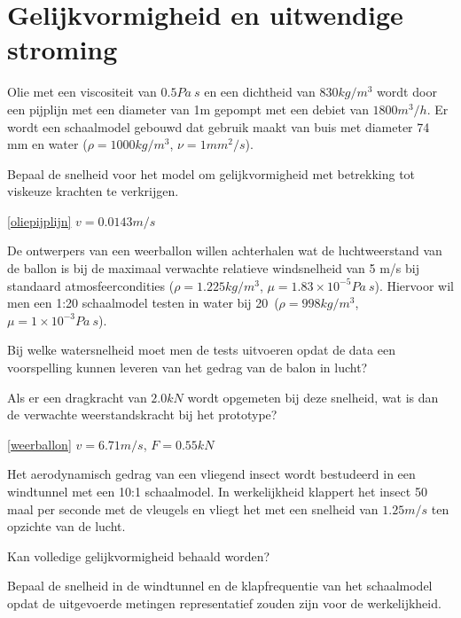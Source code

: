 \chapter{Gelijkvormigheid en uitwendige stroming}
\label{sec:Gelijkvormigheid en uitwendige stroming}
\begin{toepassing}
	\label{oliepijplijn}
Olie met een viscositeit van $0.5 \unit{Pa\ s}$ en een dichtheid van $830 \unit{kg/m^3}$ wordt door een pijplijn met een diameter van 1m gepompt met een debiet van $1800 \unit{m^3/h}$. Er wordt een schaalmodel gebouwd dat gebruik maakt van buis met diameter 74 mm en water ($\rho = 1000 \unit{kg/m^3}$, $\nu = 1 \unit{mm^2/s}$).

Bepaal de snelheid voor het model om gelijkvormigheid met betrekking tot viskeuze krachten te verkrijgen.
\end{toepassing}
\begin{antwoord}{\ref{oliepijplijn}}
	$v = 0.0143 \unit{m/s}$
\end{antwoord}
\begin{toepassing}[*]
	\label{weerballon}
De ontwerpers van een weerballon willen achterhalen wat de luchtweerstand van de ballon is bij de maximaal verwachte relatieve windsnelheid van 5 m/s bij standaard atmosfeercondities ($\rho = 1.225 \unit{kg/m^3}$, $\mu = 1.83\times 10^{-5} \unit{Pa\ s}$).
Hiervoor wil men een 1:20 schaalmodel testen in water bij 20\degC\ ($\rho = 998 \unit{kg/m^3}$, $\mu = 1\times 10^{-3} \unit{Pa\ s}$). 
		
Bij welke watersnelheid moet men de tests uitvoeren opdat de data een voorspelling kunnen leveren van het gedrag van de balon in lucht? 
		
Als er een dragkracht van $2.0 \unit{kN}$ wordt opgemeten bij deze snelheid, wat is dan de verwachte weerstandskracht bij het prototype?
\end{toepassing}
\begin{antwoord}{\ref{weerballon}}
	$v = 6.71 \unit{m/s}$, $F = 0.55 \unit{kN}$
\end{antwoord}
\begin{toepassing}[*]
	\label{insect}
Het aerodynamisch gedrag van een vliegend insect wordt bestudeerd in een windtunnel met een 10:1 schaalmodel. In werkelijkheid klappert het insect 50 maal per seconde met de vleugels en vliegt het met een snelheid van $1.25 \unit{m/s}$ ten opzichte van de lucht. 
		
Kan volledige gelijkvormigheid behaald worden?
		
Bepaal de snelheid in de windtunnel en de klapfrequentie van het schaalmodel opdat de uitgevoerde metingen representatief zouden zijn voor de werkelijkheid.
\end{toepassing}
